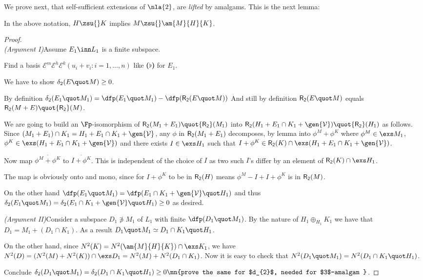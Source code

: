 We prove next, that self-sufficient extensions of $\nla{2}$, are {\em lifted} by amalgams. This
is the next lemma:
\begin{lem}\label{asymam2}
In the above notation, $H\zsu{} K$ implies $M\zsu{} \am{M}{H}{K}$.
\end{lem}
\begin{proof}\\
{\sl (Argument I)}\quad Assume $E_{1}\inn L_{1}$ is a finite subspace.

Find a basis 
$\mathcal{E}^{m}\mathcal{E}^{h}\mathcal{E}^{k}(u_{i}+v_{i}:i=1,\dots,n)$ like {\bf ($\flat$)} for $E_{1}$.

We have to show $\delta_{2}(E\quot M)\geq0$.

By definition $\delta_{2}(E_{1}\quot M_{1})=\dfp(E_{1}\quot M_{1})-\dfp({\sf R_{2}}(E\quot M))$
And still by definition ${\sf R_{2}}(E\quot M)$ equals ${\sf R_{2}}(M+E)\quot{\sf R_{2}}(M)$.

We are going to build an $\Fp$-isomorphism of ${\sf R_{2}}(M_{1}+E_{1})\quot{\sf R_{2}}(M_{1})$ into
${\sf R_{2}}(H_{1}+E_{1}\cap K_{1}+\gen{\mathcal{V}})\quot{\sf R_{2}}(H_{1})$ as follows.
Since $(M_{1}+E_{1})\cap K_{1}=H_{1}+E_{1}\cap K_{1}+\gen{\mathcal{V}}$, any $\phi$ in
${\sf R_{2}}(M_{1}+E_{1})$ decomposes, by lemma \pref{} into $\phi^{M}+\phi^{K}$ where $\phi^{M}\in\exs M_{1}$, $\phi^{K}\in\exs (H_{1}+E_{1}\cap K_{1}+\gen{\mathcal{V}})$ and there exists $I\in\exs H_{1}$ such that $I+\phi^{K}\in {\sf R_{2}}(K)\cap\exs(H_{1}+E_{1}\cap K_{1}+\gen{\mathcal{V}})$.

Now map $\overline{\phi^{M}+\phi^{K}} $ to $\overline{I+\phi^{K}}$. This is independent of the choice
of $I$ as two such $I$'s differ by an element of ${\sf R_{2}}(K)\cap\exs H_{1}$.

The map is obviously onto and mono, since for $I+\phi^{K}$ to be in ${\sf R_{2}}(H)$ means
$\phi^{M}-I+I+\phi^{K}$ is in ${\sf R_{2}}(M)$.

\smallskip
On the other hand $\dfp(E_{1}\quot M_{1})=\dfp(E_{1}\cap K_{1}+\gen{\mathcal{V}}\quot H_{1})$ and
thus $\delta_{2}(E_{1}\quot M_{1})=\delta_{2}(E_{1}\cap K_{1}+\gen{\mathcal{V}}\quot H_{1})\geq0$
as desired. 

\bigskip
{\sl (Argument II)}\quad Consider a subspace $D_{1}\nni M_{1}$ of $L_{1}$ with finite $\dfp(D_{1}\quot M_{1})$. By the nature of $H_{1}\oplus_{H_{1}}K_{1}$
we have that $D_{1}=M_{1}+(D_{1}\cap K_{1})$. As a result
$D_{1}\quot M_{1}\simeq D_{1}\cap K_{1}\quot H_{1}$.

On the other hand, since $N^{2}(K)=N^{2}(\am{M}{H}{K})\cap\exs K_{1}$, we have $N^{2}(D)=(N^{2}(M)+N^{2}(K))\cap\exs D_{1}=N^{2}(M)+N^{2}(D_{1}\cap K_{1})$.
Now it is easy to check that $N^{2}(D_{1}\quot M_{1})=N^{2}(
D_{1}\cap K_{1}\quot H_{1})$.

Conclude $\delta_{2}(D_{1}\quot M_{1})=\delta_{2}(D_{1}\cap K_{1}\quot H_{1})\geq0
\mn{prove the same for $d_{2}$, needed for $3$-amalgam }$.
\end{proof}

